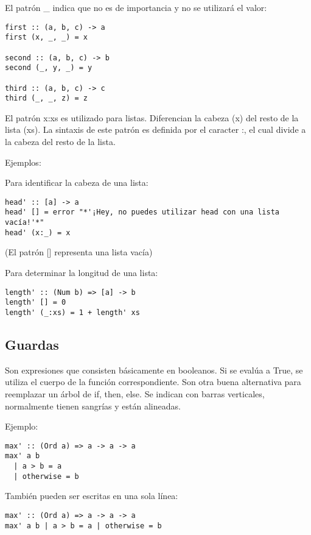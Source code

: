 El patrón \_ indica que no es de importancia y no se utilizará el valor:

\begin{lstlisting}
first :: (a, b, c) -> a
first (x, _, _) = x

second :: (a, b, c) -> b
second (_, y, _) = y

third :: (a, b, c) -> c
third (_, _, z) = z
\end{lstlisting}

El patrón x:xs es utilizado para listas. Diferencian la cabeza (x) del resto de la lista (xs). La sintaxis de este patrón es definida por el caracter :, el cual divide a la cabeza del resto de la lista.

Ejemplos:

Para identificar la cabeza de una lista:

\begin{lstlisting}
head' :: [a] -> a
head' [] = error "*'¡Hey, no puedes utilizar head con una lista vacía!'*"
head' (x:_) = x
\end{lstlisting}

(El patrón [] representa una lista vacía)

Para determinar la longitud de una lista:

\begin{lstlisting}
length' :: (Num b) => [a] -> b
length' [] = 0
length' (_:xs) = 1 + length' xs
\end{lstlisting}


\subsection{Guardas} %
\label{sub:guardas}

Son expresiones que consisten básicamente en booleanos. Si se evalúa a True, se utiliza el cuerpo de la función correspondiente. Son otra buena alternativa para reemplazar un árbol de if, then, else.
Se indican con barras verticales, normalmente tienen sangrías y están alineadas.

Ejemplo:

\begin{lstlisting}
max' :: (Ord a) => a -> a -> a
max' a b
  | a > b = a
  | otherwise = b
\end{lstlisting}

También pueden ser escritas en una sola línea:

\begin{lstlisting}
max' :: (Ord a) => a -> a -> a
max' a b | a > b = a | otherwise = b
\end{lstlisting}


